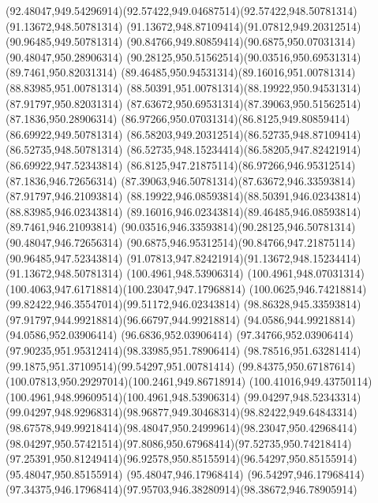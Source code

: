 {{	\curveto(92.48047,949.54296914)(92.57422,949.04687514)(92.57422,948.50781314)
	\closepath
	\moveto(91.13672,948.50781314)
	\curveto(91.13672,948.87109414)(91.07812,949.20312514)(90.96485,949.50781314)
	\curveto(90.84766,949.80859414)(90.6875,950.07031314)(90.48047,950.28906314)
	\curveto(90.28125,950.51562514)(90.03516,950.69531314)(89.7461,950.82031314)
	\curveto(89.46485,950.94531314)(89.16016,951.00781314)(88.83985,951.00781314)
	\curveto(88.50391,951.00781314)(88.19922,950.94531314)(87.91797,950.82031314)
	\curveto(87.63672,950.69531314)(87.39063,950.51562514)(87.1836,950.28906314)
	\curveto(86.97266,950.07031314)(86.8125,949.80859414)(86.69922,949.50781314)
	\curveto(86.58203,949.20312514)(86.52735,948.87109414)(86.52735,948.50781314)
	\curveto(86.52735,948.15234414)(86.58205,947.82421914)(86.69922,947.52343814)
	\curveto(86.8125,947.21875114)(86.97266,946.95312514)(87.1836,946.72656314)
	\curveto(87.39063,946.50781314)(87.63672,946.33593814)(87.91797,946.21093814)
	\curveto(88.19922,946.08593814)(88.50391,946.02343814)(88.83985,946.02343814)
	\curveto(89.16016,946.02343814)(89.46485,946.08593814)(89.7461,946.21093814)
	\curveto(90.03516,946.33593814)(90.28125,946.50781314)(90.48047,946.72656314)
	\curveto(90.6875,946.95312514)(90.84766,947.21875114)(90.96485,947.52343814)
	\curveto(91.07813,947.82421914)(91.13672,948.15234414)(91.13672,948.50781314)
	\closepath
	\moveto(100.4961,948.53906314)
	\curveto(100.4961,948.07031314)(100.4063,947.61718814)(100.23047,947.17968814)
	\curveto(100.0625,946.74218814)(99.82422,946.35547014)(99.51172,946.02343814)
	\curveto(98.86328,945.33593814)(97.91797,944.99218814)(96.66797,944.99218814)
	\lineto(94.0586,944.99218814)
	\lineto(94.0586,952.03906414)
	\lineto(96.6836,952.03906414)
	\curveto(97.34766,952.03906414)(97.90235,951.95312414)(98.33985,951.78906414)
	\curveto(98.78516,951.63281414)(99.1875,951.37109514)(99.54297,951.00781414)
	\curveto(99.84375,950.67187614)(100.07813,950.29297014)(100.2461,949.86718914)
	\curveto(100.41016,949.43750114)(100.4961,948.99609514)(100.4961,948.53906314)
	\closepath
	\moveto(99.04297,948.52343314)
	\curveto(99.04297,948.92968314)(98.96877,949.30468314)(98.82422,949.64843314)
	\curveto(98.67578,949.99218414)(98.48047,950.24999614)(98.23047,950.42968414)
	\curveto(98.04297,950.57421514)(97.8086,950.67968414)(97.52735,950.74218414)
	\curveto(97.25391,950.81249414)(96.92578,950.85155914)(96.54297,950.85155914)
	\lineto(95.48047,950.85155914)
	\lineto(95.48047,946.17968414)
	\lineto(96.54297,946.17968414)
	\curveto(97.34375,946.17968414)(97.95703,946.38280914)(98.38672,946.78905914)
}}
